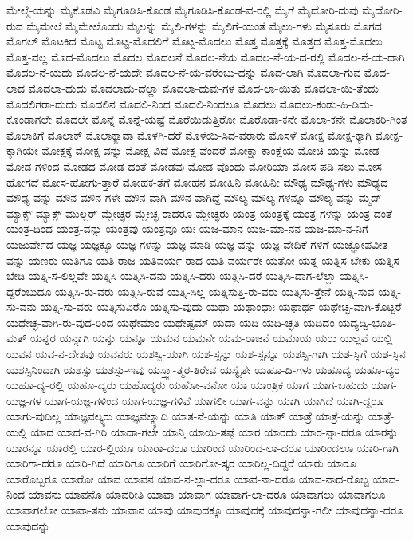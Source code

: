 {ಮೇಲ್ಮೆ-ಯನ್ನು
ಮೈಕೊಡವಿ
ಮೈಗೂಡಿಸಿ-ಕೊಂಡ
ಮೈಗೂಡಿಸಿ-ಕೊಂಡ-ವ-ರಲ್ಲಿ
ಮೈಗೆ
ಮೈದೋರಿ-ದುವು
ಮೈದೋರಿ-ರುವ
ಮೈಮೇಲೆ
ಮೈಮೇಲೊಂದು
ಮೈಲನ್ನು
ಮೈಲಿ-ಗಳನ್ನು
ಮೈಲಿಗೆ-ಯಂತೆ
ಮೈಲು-ಗಳು
ಮೈಸೂರು
ಮೊಗದ
ಮೊಗಲ್
ಮೊಟಕಿದ
ಮೊಟ್ಟ
ಮೊಟ್ಟ-ಮೊದಲಿಗೆ
ಮೊಟ್ಟ-ಮೊದಲು
ಮೊತ್ತ
ಮೊತ್ತಕ್ಕೆ
ಮೊತ್ತದ
ಮೊತ್ತ-ಮೊದಲು
ಮೊತ್ತ-ವಲ್ಲ
ಮೊದ-ಮೊದಲು
ಮೊದಲ
ಮೊದಲನೆ
ಮೊದಲ-ನೆಯ
ಮೊದಲ-ನೆ-ಯ-ದ-ರಲ್ಲಿ
ಮೊದಲ-ನೆ-ಯ-ದಾಗಿ
ಮೊದಲ-ನೆ-ಯದು
ಮೊದಲ-ನೆ-ಯದೇ
ಮೊದಲ-ನೆ-ಯ-ವರೆಂಬು-ದನ್ನು
ಮೊದ-ಲಾಗಿ
ಮೊದಲಾ-ಗುವ
ಮೊದ-ಲಾದ
ಮೊದಲಾ-ದುದು
ಮೊದಲಾದು-ದೆಲ್ಲಾ
ಮೊದಲಾ-ದುವು-ಗಳ
ಮೊದ-ಲಾ-ಯಿತು
ಮೊದಲಾ-ಯಿ-ತೆಂದು
ಮೊದಲಿಗರಾ-ದುದು
ಮೊದಲಿನ
ಮೊದಲಿ-ನಿಂದ
ಮೊದಲಿ-ನಿಂದಲೂ
ಮೊದಲು
ಮೊದಲು-ಕಂಡು-ಹಿ-ಡಿದು-ಕೊಂಡಾಗಲೇ
ಮೊದಲೇ
ಮೊನ್ನೆ
ಮೊನ್ನೆ-ಯಷ್ಟೆ
ಮೊರೆಯಿಡುತ್ತಿರೋ
ಮೊರೊಡಾ-ಕನೇ
ಮೊಲಾ-ಕನೇ
ಮೊಲಾಕರಿ-ಗಿಂತ
ಮೊಲಾಕಿಗೆ
ಮೊಲಾಕ್
ಮೊಲಾಕ್ಯಾವಾ
ಮೊಳಗಿ-ದರೆ
ಮೊಳೆಯಿ-ಸಿದ-ವರಾರು
ಮೊಸಳೆ
ಮೋಕ್ಷ
ಮೋಕ್ಷ-ಕ್ಕಾಗಿ
ಮೋಕ್ಷ-ಕ್ಕಾಗಿಯೇ
ಮೋಕ್ಷಕ್ಕೆ
ಮೋಕ್ಷ-ವನ್ನು
ಮೋಕ್ಷ-ವಿದೆ
ಮೋಕ್ಷ-ವೆಂದರೆ
ಮೋಕ್ಷಾ-ಕಾಂಕ್ಷೆಯ
ಮೋಚಿ-ಯನ್ನು
ಮೋಡ
ಮೋಡ-ಗಳಿಂದ
ಮೋಡದ
ಮೋಡ-ದಂತೆ
ಮೋಡವು
ಮೋಡ-ವೊಂದು
ಮೋರಿಯಾ
ಮೋಸ-ಪಡಿ-ಸಲು
ಮೋಸ-ಹೋಗದೆ
ಮೋಸ-ಹೋಗು-ತ್ತಾರೆ
ಮೋಹಕ-ತೆಗೆ
ಮೋಹನ
ಮೋಹಿನಿ
ಮೋಹಿನೀ
ಮೌಢ್ಯ
ಮೌಢ್ಯ-ಗಳು
ಮೌಢ್ಯದ
ಮೌಢ್ಯ-ವನ್ನು
ಮೌನ
ಮೌನ-ಗಳೇ
ಮೌನ-ವಾಗಿ
ಮೌನ-ವಾಗಿದ್ದೆ
ಮೌಲ್ಯ
ಮೌಲ್ಯ-ಗಳನ್ನೂ
ಮೌಲ್ಯ-ವನ್ನು
ಮ್ಮದ್
ಮ್ಯಾಕ್ಸ್
ಮ್ಯಾಕ್ಸ್-ಮುಲ್ಲರ್
ಮ್ಲೇಚ್ಛರ
ಮ್ಲೇಚ್ಛ-ರಾದರೂ
ಮ್ಲೇಚ್ಛರು
ಯಂತ್ರ
ಯಂತ್ರಕ್ಕೆ
ಯಂತ್ರ-ಗಳನ್ನು
ಯಂತ್ರ-ದಂತೆ
ಯಂತ್ರ-ದಿಂದ
ಯಂತ್ರ-ವನ್ನು
ಯಂತ್ರವು
ಯಂತ್ರವೂ
ಯಃ
ಯಜ-ಮಾನ
ಯಜ-ಮಾ-ನನ
ಯಜ-ಮಾ-ನ-ನಿಗೆ
ಯಜುರ್ವೇದ
ಯಜ್ಞ
ಯಜ್ಞಕ್ಕೂ
ಯಜ್ಞ-ಗಳನ್ನು
ಯಜ್ಞ-ಮಾಡಿ
ಯಜ್ಞ-ವನ್ನು
ಯಜ್ಞ-ವೇದಿಕೆ-ಗಳಿಗೆ
ಯಜ್ಞೋಪವೀತ-ವನ್ನು
ಯಣರು
ಯತಿಗೂ
ಯತಿ-ರಾಜ
ಯತಿವರ್ಯ-ರಾದ
ಯತಿ-ವರ್ಯರೇ
ಯತೋ
ಯತ್ನ
ಯತ್ನಿಸ-ಬೇಕು
ಯತ್ನಿಸ-ಬೇಡಿ
ಯತ್ನಿ-ಸ-ಲಿಲ್ಲವೇ
ಯತ್ನಿಸಿ
ಯತ್ನಿಸಿ-ದನು
ಯತ್ನಿಸಿ-ದರು
ಯತ್ನಿಸಿ-ದರೆ
ಯತ್ನಿಸಿ-ದಾಗ-ಲೆಲ್ಲಾ
ಯತ್ನಿಸಿ-ದ್ದರೆಂಬುದೂ
ಯತ್ನಿಸಿ-ರು-ವರು
ಯತ್ನಿಸಿ-ರುವೆ
ಯತ್ನಿ-ಸಿಲ್ಲ
ಯತ್ನಿಸುತ್ತಿ-ರು-ವರು
ಯತ್ನಿಸು-ತ್ತೇನೆ
ಯತ್ನಿ-ಸುವ
ಯತ್ನಿ-ಸು-ವನು
ಯತ್ನಿ-ಸು-ವರು
ಯತ್ನಿಸುವಿರೊ
ಯತ್ನಿಸು-ವುದು
ಯಥಾ
ಯಥಾಂಧಾಃ
ಯಥಾರ್ಥ
ಯಥೇಚ್ಛ-ವಾಗಿ-ಕೊಟ್ಟರೆ
ಯಥೇಚ್ಛ-ವಾಗಿ-ರು-ವುದ-ರಿಂದ
ಯಥೇಮಾಂ
ಯಥೇಷ್ಟಮ್
ಯದಾ
ಯದಿ
ಯದಿ-ಚ್ಛತಿ
ಯದಿದಂ
ಯದ್ಯದ್ವಿ-ಭೂತಿ-ಮತ್
ಯನ್ನರ
ಯನ್ನಾಗಿ
ಯನ್ನು
ಯನ್ನೂ
ಯಮನ
ಯಮನೇ
ಯಮ-ರಾಜನೆ
ಯಮಾಯ
ಯರು
ಯಲ್ಲವೆ
ಯಲ್ಲಿ
ಯವನ
ಯವ-ನ-ದೇಶವು
ಯವನರು
ಯಶಸ್ವಿ-ಯಾಗಿ
ಯಶ-ಸ್ಸನ್ನು
ಯಶ-ಸ್ಸನ್ನೂ
ಯಶಸ್ಸಿ-ಗಾಗಿ
ಯಶ-ಸ್ಸಿಗೆ
ಯಶ-ಸ್ಸಿನ
ಯಶಸ್ಸಿನಿಂದಾಗಿ
ಯಶಸ್ಸು
ಯಶಸ್ಸು-ಇವು
ಯಸ್ತ್ವಾ-ತ್ಮರ-ತಿರೇವ
ಯಸ್ಯೈತೇ
ಯಹೂ-ದಿ-ಗಳು
ಯಹೂದ್ಯ
ಯಹೂ-ದ್ಯರ
ಯಹೂ-ದ್ಯ-ರಲ್ಲಿ
ಯಹೂ-ದ್ಯರು
ಯಹೊದ್ಯರು
ಯಹೋ-ವನೋ
ಯಾ
ಯಾಂತ್ರಿಕ
ಯಾಗ
ಯಾಗ-ಬಹುದು
ಯಾಗ-ಯಜ್ಞ-ಗಳ
ಯಾಗ-ಯಜ್ಞ-ಗಳಿಂದ
ಯಾಗ-ಯಜ್ಞ-ಗಳಿವೆ
ಯಾಗಲೀ
ಯಾಗ-ವನ್ನು
ಯಾಗಿ
ಯಾಗಿದೆ
ಯಾಗಿ-ದ್ದರೂ
ಯಾಗು-ವುದಿಲ್ಲ
ಯಾಜ್ಞವಲ್ಕ್ಯರು
ಯಾಜ್ಞವಲ್ಕ್ಯಾದಿ
ಯಾತ-ನೆ-ಯನ್ನು
ಯಾತಿ
ಯಾತ್
ಯಾತ್ರೆ
ಯಾತ್ರೆ-ಯನ್ನು
ಯಾತ್ರೆ-ಯಲ್ಲಿ
ಯಾದ
ಯಾದ-ವ-ಗಿರಿ
ಯಾದಾ-ಗಲೇ
ಯಾನ್ತಿ
ಯಾಯಿ-ತಷ್ಟೆ
ಯಾರ
ಯಾರದು
ಯಾರ-ನ್ನಾ-ದರೂ
ಯಾರನ್ನು
ಯಾರನ್ನೂ
ಯಾರಲ್ಲಿ
ಯಾರ-ಲ್ಲಿಯೂ
ಯಾರಾ-ದರೂ
ಯಾರಿಂದ
ಯಾರಿಂದ-ಲಾ-ದರೂ
ಯಾರಿಂದಲೂ
ಯಾರಿ-ಗಾಗಿ
ಯಾರಿಗಾ-ದರೂ
ಯಾರಿ-ಗಿದೆ
ಯಾರಿಗೂ
ಯಾರಿಗೆ
ಯಾರಿಗೋ-ಸ್ಕರ
ಯಾರಿಲ್ಲ-ದಿದ್ದರೆ
ಯಾರು
ಯಾರೂ
ಯಾರೊಬ್ಬರೂ
ಯಾರೋ
ಯಾವ
ಯಾವನ
ಯಾವ-ನ-ಲ್ಲಾ-ದರೂ
ಯಾವ-ನಾ-ದರೂ
ಯಾವ-ನಾದ-ರೊಬ್ಬ
ಯಾವ-ನಿಂದ
ಯಾವನು
ಯಾವನೊ
ಯಾವರೀತಿ
ಯಾವಾ
ಯಾವಾಗ
ಯಾವಾಗ-ಲಾ-ದರೂ
ಯಾವಾಗಲು
ಯಾವಾಗಲೂ
ಯಾವಾಗಲೋ
ಯಾವಾ-ತನು
ಯಾವಾನ
ಯಾವು
ಯಾವುದಕ್ಕೂ
ಯಾವುದಕ್ಕೆ
ಯಾವುದನ್ನಾ-ಗಲೀ
ಯಾವುದನ್ನಾ-ದರೂ
ಯಾವುದನ್ನು
}
